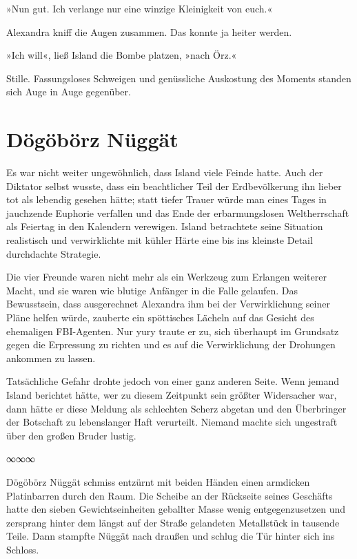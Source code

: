 »Nun gut. Ich verlange nur eine winzige Kleinigkeit von euch.«

Alexandra kniff die Augen zusammen. Das konnte ja heiter werden.

»Ich will«, ließ Island die Bombe platzen, »nach Örz.«

Stille. Fassungsloses Schweigen und genüssliche Auskostung des Moments standen sich Auge in Auge gegenüber.

\chapter{Dögöbörz Nüggät}

Es war nicht weiter ungewöhnlich, dass Island viele Feinde hatte. Auch der Diktator selbst wusste, dass ein beachtlicher Teil der Erdbevölkerung ihn lieber tot als lebendig gesehen hätte; statt tiefer Trauer würde man eines Tages in jauchzende Euphorie verfallen und das Ende der erbarmungslosen Weltherrschaft als Feiertag in den Kalendern verewigen. Island betrachtete seine Situation realistisch und verwirklichte mit kühler Härte eine bis ins kleinste Detail durchdachte Strategie.

Die vier Freunde waren nicht mehr als ein Werkzeug zum Erlangen weiterer Macht, und sie waren wie blutige Anfänger in die Falle gelaufen. Das Bewusstsein, dass ausgerechnet Alexandra ihm bei der Verwirklichung seiner Pläne helfen würde, zauberte ein spöttisches Lächeln auf das Gesicht des ehemaligen FBI-Agenten. Nur yury traute er zu, sich überhaupt im Grundsatz gegen die Erpressung zu richten und es auf die Verwirklichung der Drohungen ankommen zu lassen.

Tatsächliche Gefahr drohte jedoch von einer ganz anderen Seite. Wenn jemand Island berichtet hätte, wer zu diesem Zeitpunkt sein größter Widersacher war, dann hätte er diese Meldung als schlechten Scherz abgetan und den Überbringer der Botschaft zu lebenslanger Haft verurteilt. Niemand machte sich ungestraft über den großen Bruder lustig.

\begin{center}
	∞∞∞
\end{center}

Dögöbörz Nüggät schmiss entzürnt mit beiden Händen einen armdicken Platinbarren durch den Raum. Die Scheibe an der Rückseite seines Geschäfts hatte den sieben Gewichtseinheiten geballter Masse wenig entgegenzusetzen und zersprang hinter dem längst auf der Straße gelandeten Metallstück in tausende Teile. Dann stampfte Nüggät nach draußen und schlug die Tür hinter sich ins Schloss.

